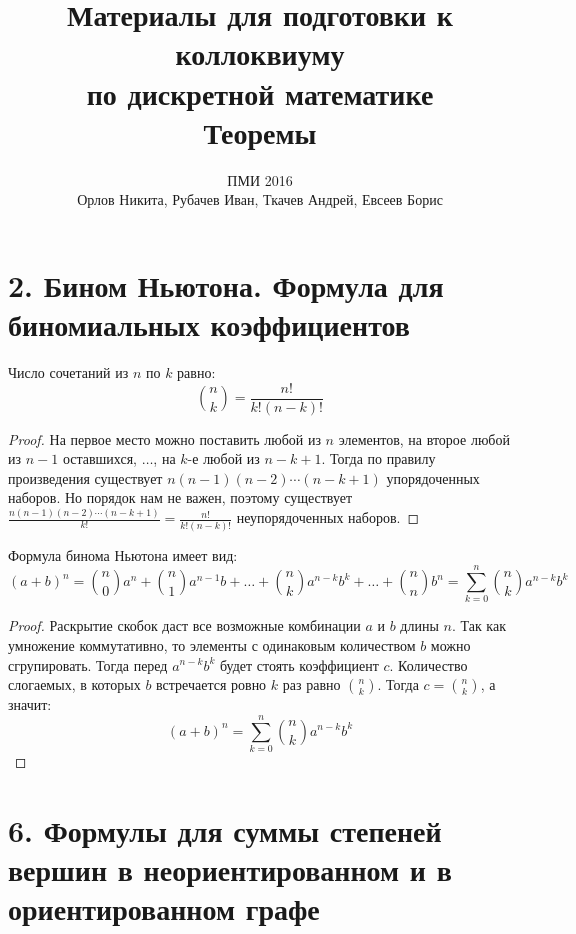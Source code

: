 \documentclass[a4paper,12pt]{article}
\begin{document}
	\title{Материалы для подготовки к коллоквиуму\\ по дискретной математике \\
	Теоремы}
	\author{ПМИ 2016 \\ Орлов Никита, Рубачев Иван, Ткачев Андрей, Евсеев Борис}
	\maketitle
	 
	\section*{2. Бином Ньютона. Формула для биномиальных коэффициентов}
        Число сочетаний из $n$ по $k$ равно:
        \[
            \binom{n}{k} = \frac{n!}{k!(n - k)!}
        \]
        \begin{proof}
            На первое место можно поставить любой из $n$ элементов, на второе любой из $n - 1$ оставшихся, $\ldots$, на $k$-е любой из $n - k + 1$. Тогда по правилу произведения существует $n(n - 1)(n - 2)\cdots(n - k + 1)$ упорядоченных наборов. Но порядок нам не важен, поэтому существует $\displaystyle\frac{n(n - 1)(n - 2)\cdots(n - k + 1)}{k!} = \frac{n!}{k!(n - k)!}$ неупорядоченных наборов.
        \end{proof}
        Формула бинома Ньютона имеет вид:
        \[
            (a + b)^{n} = \binom{n}{0}a^{n} + \binom{n}{1}a^{n - 1}b + \ldots + \binom{n}{k}a^{n - k}b^{k} + \ldots + \binom{n}{n}b^{n} = \sum_{k = 0}^{n}\binom{n}{k}a^{n - k}b^{k}
        \]
        \begin{proof}
            Раскрытие скобок даст все возможные комбинации $a$ и $b$ длины $n$. Так как умножение коммутативно, то элементы с одинаковым количеством $b$ можно сгрупировать. Тогда перед $a^{n - k}b^{k}$ будет стоять коэффициент $c$. Количество слогаемых, в которых $b$ встречается ровно $k$ раз равно $\displaystyle\binom{n}{k}$. Тогда $c = \displaystyle\binom{n}{k}$, а значит:
            \[
                (a + b)^{n} = \sum_{k = 0}^{n}\binom{n}{k}a^{n - k}b^{k}
            \]
        \end{proof}
    \pagebreak %
    \section*{6. Формулы для суммы степеней вершин в неориентированном и в ориентированном графе}
\end{document}
